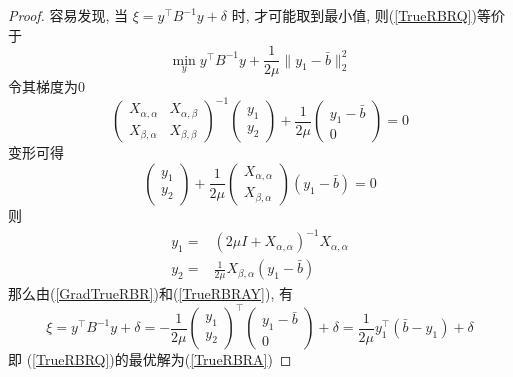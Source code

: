 \documentclass[a4paper, UTF8]{ctexart}				%
\numberwithin{equation}{section}				%
\begin{document}
			\begin{proof}
				容易发现, 当 $\xi = y^\top B^{-1}y + \delta$ 时, 才可能取到最小值, 则(\ref{TrueRBRQ})等价于
				\begin{equation}
					\min_y y^\top B^{-1}y + \frac{1}{2\mu} \lVert{y_1-\bar{b}}\rVert^2_2
				\end{equation}
				令其梯度为0
				\begin{equation}\label{GradTrueRBR}
						{\begin{pmatrix}
							X_{\alpha, \alpha} & X_{\alpha, \beta}\\
							X_{\beta, \alpha} & X_{\beta, \beta}
						\end{pmatrix}}^{-1}
						\begin{pmatrix}
							y_1 \\ y_2
						\end{pmatrix}
					+	\frac{1}{2\mu}
						\begin{pmatrix}
							y_1 - \bar{b} \\ 0
						\end{pmatrix}
					=	0
				\end{equation}
				变形可得 
				\begin{equation}
						\begin{pmatrix}
							y_1 \\ y_2
						\end{pmatrix}
					+	\frac{1}{2\mu}
						\begin{pmatrix}
							X_{\alpha, \alpha} \\ X_{\beta, \alpha}
						\end{pmatrix}
						(y_1 - \bar{b})
					=	0
				\end{equation}
				则 
				\begin{equation}
					\begin{split}\label{TrueRBRAY}
						y_1 =
							& (2 \mu I + X_{\alpha, \alpha})^{-1} X_{\alpha, \alpha}\\
						y_2 =
							& \frac{1}{2\mu} X_{\beta, \alpha} (y_1 - \bar{b})
					\end{split}
				\end{equation}
				那么由(\ref{GradTrueRBR})和(\ref{TrueRBRAY}), 有
				\begin{equation}\label{TrueRBRAXi}
						\xi
					=	y^\top B^{-1}y + \delta
					= 	- \frac{1}{2\mu}
						\begin{pmatrix}
							y_1 \\ y_2
						\end{pmatrix}^\top
						\begin{pmatrix}
							y_1 - \bar{b} \\ 0
						\end{pmatrix}
						+ \delta
					=	\frac{1}{2 \mu} y_1^\top (\bar{b} - y_1) + \delta
				\end{equation}
				即 (\ref{TrueRBRQ})的最优解为(\ref{TrueRBRA})
			\end{proof}
			
\end{document}
